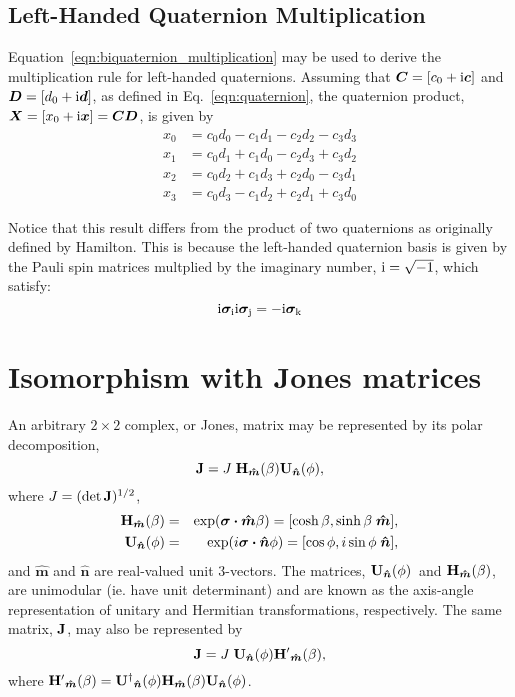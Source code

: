 \documentclass[12pt]{article}
\newcommand{\Ci}{{\rm i}}
\newcommand{\boost}[1][]{{\ensuremath{ {\bf H}{#1}_{\bm{\hat m}}(\beta) }}}
\newcommand{\rotat}[1][]{{\ensuremath{ {\bf U}{#1}_{\bm{\hat n}}(\phi) }}}
\newcommand{\pauli}[1]{\ensuremath{ {\bm\sigma}_{\rm #1} }}
\begin{document}
\subsection{Left-Handed Quaternion Multiplication}
\label{sec:qmult}
Equation~\ref{eqn:biquaternion_multiplication} may be used to derive
the multiplication rule for left-handed quaternions.  Assuming that
$\bm{C}=[c_0+\Ci\bm{c}]$ and $\bm{D}=[d_0+\Ci\bm{d}]$, as defined in
Eq.~\ref{eqn:quaternion}, the quaternion product,
$\bm{X}=[x_0+\Ci\bm{x}]=\bm{CD}$, is given by
\begin{equation}\label{eqn:quaternion_multiplication}
\begin{array}{rl}
x_0 & = c_0d_0 - c_1d_1 - c_2d_2 - c_3d_3 \\
x_1 & = c_0d_1 + c_1d_0 - c_2d_3 + c_3d_2 \\
x_2 & = c_0d_2 + c_1d_3 + c_2d_0 - c_3d_1 \\
x_3 & = c_0d_3 - c_1d_2 + c_2d_1 + c_3d_0
\end{array}
\end{equation}

Notice that this result differs from the product of two quaternions as
originally defined by Hamilton.  This is because the left-handed
quaternion basis is given by the Pauli spin matrices multplied by the
imaginary number, $\Ci=\sqrt{-1}$, which satisfy:
\begin{equation}
\Ci\pauli{i} \Ci\pauli{j} = -\Ci\pauli{k}
\end{equation}


\section{Isomorphism with Jones matrices}

An arbitrary $2\times2$ complex, or Jones, matrix may be represented
by its polar decomposition,
\begin{equation}
{\bf J} = J \; \boost \rotat,
\label{eqn:polar_decomposition}
\end{equation}
where $J=(\det{\bf J})^{1/2}$,
\begin{eqnarray}
\boost &=& \exp(\bm{\sigma\cdot}\bm{\hat m}\beta)
        = [\cosh\beta,\sinh\beta\;\bm{\hat m}],
\label{eqn:boost} \\
\rotat &=& \exp(i\bm{\sigma\cdot}\bm{\hat n}\phi)
        = [\cos\phi,i\sin\phi\;\bm{\hat n}],
\label{eqn:rotation}
\end{eqnarray}
and $\bm{\hat m}$ and $\bm{\hat n}$ are real-valued unit 3-vectors.
The matrices, \rotat\ and \boost, are unimodular (ie. have unit
determinant) and are known as the axis-angle representation of unitary
and Hermitian transformations, respectively. The same matrix, ${\bf J}$,
may also be represented by 
\begin{equation}
{\bf J}=J\;\rotat\boost[^\prime],
\end{equation}
where $\boost[^\prime]=\rotat[^\dagger]\boost\rotat$.
\end{document}
